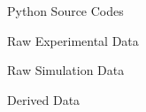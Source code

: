 {Python Source Codes}
        
{Raw Experimental Data}
        
{Raw Simulation Data}
        
{Derived Data}
        














